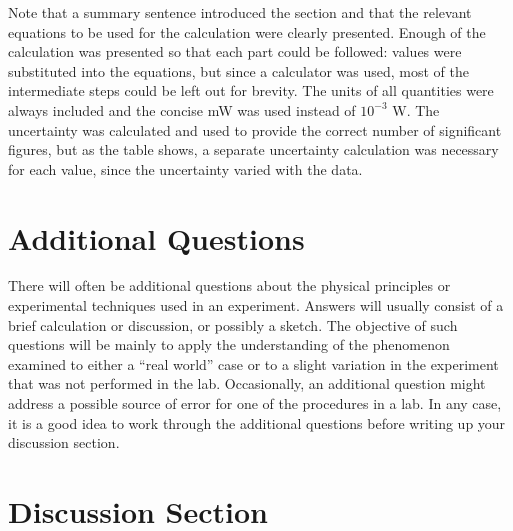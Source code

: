 Note that a summary sentence introduced the section and that the relevant 
equations to be used for the calculation were clearly presented.  Enough
of the calculation was presented so that each part could be followed: values
were substituted into the equations, but since a calculator was used, most
of the intermediate steps could be left out for brevity. The units of all 
quantities were always included and the concise mW was used instead of 
$10^{-3}$ W. The uncertainty was calculated and used to provide the correct 
number of significant figures, but as the table shows, a separate uncertainty 
calculation was necessary for each value, since the uncertainty varied with
the data.   

\section{Additional Questions}
	
There will often be additional questions about the physical  principles
or experimental techniques used in an experiment.  Answers will usually consist
of a brief calculation or discussion,  or possibly a sketch.  The objective of
such questions will be mainly to apply the understanding of the phenomenon
examined to either a ``real world'' case or to a slight variation in the
experiment that was not performed in the lab.  Occasionally, an additional 
question might address a possible source of error for one of the procedures in
a lab.  In any case, it is a good idea to work through the additional questions
before writing up your discussion section. 

\section{Discussion Section}
	
